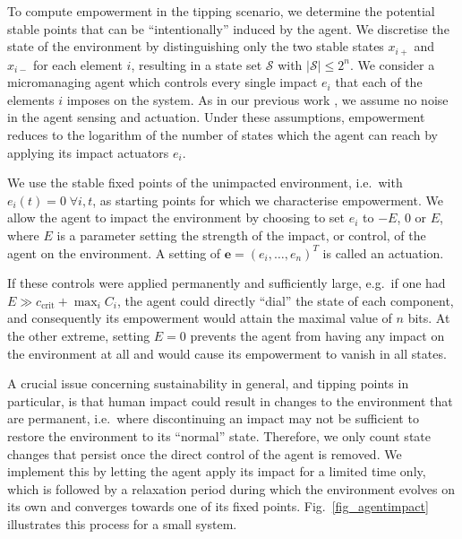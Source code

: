\documentclass[conference]{IEEEtran}
\newcommand{\vectorsym}[1]{\ensuremath{\mathbf{#1}}}
\newcommand{\ccrit}{\ensuremath{c_{\mathrm{crit}}}}
\newcommand{\agentimpact}{\ensuremath{e}}
\newcommand{\setsymbol}[1]{\ensuremath{\mathcal{#1}}}
\newcommand{\stateset}{\ensuremath{\setsymbol{S}}}
\newcommand{\couplingfunction}{\ensuremath{C}}
\newcommand{\impactstrength}{\ensuremath{E}}
\begin{document}

To compute empowerment in the tipping scenario, we determine the
potential stable points that can be ``intentionally'' induced by the
agent. We discretise the state of the environment by distinguishing
only the two stable states $x_{i+}$ and $x_{i-}$ for each element $i$,
resulting in a state set $\stateset$ with $|\stateset| \le 2^n$. We
consider a micromanaging agent which controls every
single impact $\agentimpact_i$ that each of the elements $i$ imposes on
the system. As in our previous work \cite{Kim2009_sustainability}, we
assume no noise in the agent sensing and actuation. Under these
assumptions, empowerment reduces to  the logarithm of the number of states
which the agent can reach by applying its
impact actuators $\agentimpact_i$.

We use the stable fixed points of the unimpacted environment, i.e.\
with $\agentimpact_i(t) = 0\; \forall i, t$, as starting points for
which we characterise empowerment. We allow the agent to impact the
environment by choosing to set $\agentimpact_i$ to $-\impactstrength$,
$0$ or $\impactstrength$, where $\impactstrength$ is a parameter
setting the strength of the impact, or control, of the agent on the
environment. A setting of
$\vectorsym{\agentimpact} = (\agentimpact_i, \ldots,
\agentimpact_n)^T$ is called an actuation.

If these controls were applied permanently and sufficiently large,
e.g.\ if one had
$\impactstrength \gg \ccrit + \max_i \couplingfunction_i$, the agent
could directly ``dial'' the state of each component, and consequently
its empowerment would attain the maximal value of $n$ bits. At the
other extreme, setting $\impactstrength = 0$ prevents the agent from
having any impact on the environment at all and would cause its
empowerment to vanish in all states.

A crucial issue concerning sustainability in general, and tipping
points in particular, is that human impact could result in changes to
the environment that are permanent, i.e.\ where discontinuing an
impact may not be sufficient to restore the environment to its
``normal'' state. Therefore, we only count state changes that persist
once the direct control of the agent is removed. We implement this by
letting the agent apply its impact for a limited time only, which is
followed by a relaxation period during which the environment evolves
on its own and converges towards one of its fixed points.
Fig.~\ref{fig_agentimpact} illustrates this process for a small
system.
\end{document}
